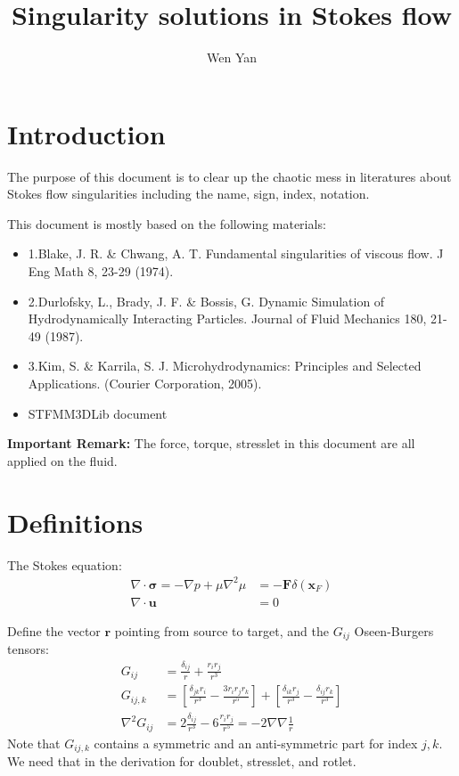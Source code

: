 \documentclass[11pt]{article}
\author{Wen Yan}
\newcommand{\bF}{\ensuremath{\bm{F}}}
\newcommand{\br}{\ensuremath{\bm{r}}}
\newcommand{\bu}{\ensuremath{\bm{u}}}
\newcommand{\bx}{\ensuremath{\bm{x}}}
\newcommand{\bsigma}{\ensuremath{\bm{\sigma}}}
\begin{document}
\title{Singularity solutions in Stokes flow}
\maketitle
\section{Introduction}
The purpose of this document is to clear up the chaotic mess in literatures about Stokes flow singularities including the name, sign, index, notation.

This document is mostly based on the following materials:
\begin{itemize}
	\item 1.Blake, J. R. \& Chwang, A. T. Fundamental singularities of viscous flow. J Eng Math 8, 23-29 (1974).
	\item 2.Durlofsky, L., Brady, J. F. \& Bossis, G. Dynamic Simulation of Hydrodynamically Interacting Particles. Journal of Fluid Mechanics 180, 21-49 (1987).
	\item 3.Kim, S. \& Karrila, S. J. Microhydrodynamics: Principles and Selected Applications. (Courier Corporation, 2005).
	\item STFMM3DLib document
\end{itemize}

\textbf{Important Remark: }The force, torque, stresslet in this document are all applied on the fluid.

\section{Definitions}
The Stokes equation:
\begin{align}
	\nabla\cdot\bsigma = -\nabla p + \mu \nabla^2 \mu &= -\bF \delta(\bx_F) \\
	\nabla\cdot\bu &=0
\end{align}

Define the vector $\br$ pointing from source to target, and the $G_{ij}$ Oseen-Burgers tensors:
\begin{align}
	G_{ij} &= \frac{\delta_{ij}}{r} + \frac{r_ir_j}{r^3}\\
	G_{ij,k} &= \left[ \frac{\delta_{jk}r_i}{r^3} - \frac{3r_ir_jr_k}{r^5} \right] + \left[\frac{\delta_{ik}r_j}{r^3} -\frac{\delta_{ij}r_k}{r^3} \right] \\
	\nabla^2 G_{ij} &= 2\frac{\delta_{ij}}{r^3} - 6\frac{r_ir_j}{r^5} = -2\nabla\nabla \frac{1}{r}
\end{align}
Note that $G_{ij,k}$ contains a symmetric and an anti-symmetric part for index $j,k$. We need that in the derivation for doublet, stresslet, and rotlet. 
\end{document}
